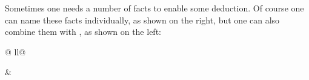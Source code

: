 \begin{isabellebody}
\begin{isamarkuptext}
Sometimes one needs a number of facts to enable some deduction. Of course
one can name these facts individually, as shown on the right,
but one can also combine them with , as shown on the left:%
\end{isamarkuptext}%
\isamarkuptrue%
%
\begin{tabular}{@ {}ll@ {}}
\begin{minipage}[t]{.4\textwidth}
\end{minipage}
&
\qquad
\begin{minipage}[t]{.4\textwidth}
\end{minipage}
\end{tabular}
\end{isabellebody}
